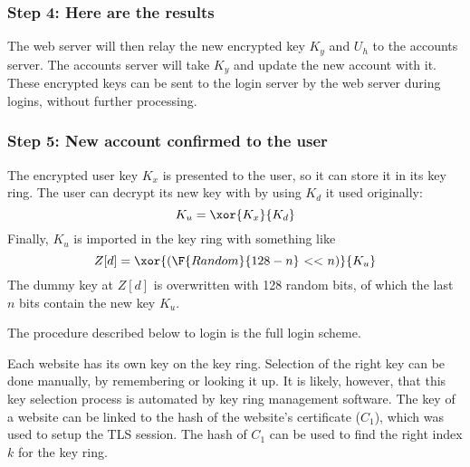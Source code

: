 \subsubsection{Step 4: Here are the results}
\label{sec:apply_step4}
The web server will then relay the new encrypted key $K_y$ and $U_h$ to the accounts server.
The accounts server will take $K_y$
and update the new account with it.
These encrypted keys can be sent to the login server by the web server during logins,
without further processing.

\subsubsection{Step 5: New account confirmed to the user}
\label{sec:apply_step5}
The encrypted user key $K_x$ is presented to the user,
so it can store it in its key ring.
The user can decrypt its new key with by using $K_d$ it used originally:
\[K_u=\xor{K_x}{K_d}\]
Finally, $K_u$ is imported in the key ring with something like
\[Z[d]=\xor{(\F{Random}{128-n}\ \mathbf{<<}\ n)}{K_u}\]
The dummy key at $Z[d]$ is overwritten with 128 random bits,
of which the last $n$ bits contain the new key $K_u$.

\label{sec:full_login}
The procedure described below to login is the full login scheme.
\par
Each website has its own key on the key ring.
Selection of the right key can be done manually, by remembering or looking it up.
It is likely, however, that this key selection process is automated by key ring management software.
The key of a website can be linked to the hash of the website's certificate ($C_1$),
which was used to setup the TLS session.
The hash of $C_1$ can be used to find the right index $k$ for the key ring.

